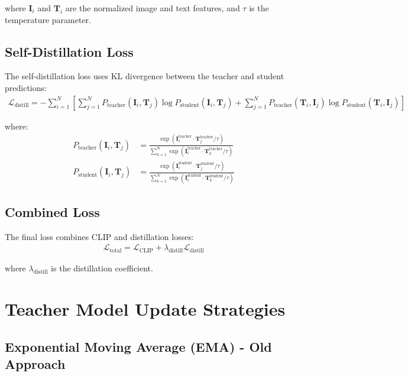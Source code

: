 \documentclass[11pt]{article}
\begin{document}
where $\mathbf{I}_i$ and $\mathbf{T}_i$ are the normalized image and text features, and $\tau$ is the temperature parameter.

\subsection{Self-Distillation Loss}

The self-distillation loss uses KL divergence between the teacher and student predictions:
\begin{align}
\mathcal{L}_{\text{distill}} = -\sum_{i=1}^{N} \left[ \sum_{j=1}^{N} P_{\text{teacher}}(\mathbf{I}_i, \mathbf{T}_j) \log P_{\text{student}}(\mathbf{I}_i, \mathbf{T}_j) + \sum_{j=1}^{N} P_{\text{teacher}}(\mathbf{T}_i, \mathbf{I}_j) \log P_{\text{student}}(\mathbf{T}_i, \mathbf{I}_j) \right]
\end{align}

where:
\begin{align}
P_{\text{teacher}}(\mathbf{I}_i, \mathbf{T}_j) &= \frac{\exp(\mathbf{I}_i^{\text{teacher}} \cdot \mathbf{T}_j^{\text{teacher}} / \tau)}{\sum_{k=1}^{N} \exp(\mathbf{I}_i^{\text{teacher}} \cdot \mathbf{T}_k^{\text{teacher}} / \tau)} \\
P_{\text{student}}(\mathbf{I}_i, \mathbf{T}_j) &= \frac{\exp(\mathbf{I}_i^{\text{student}} \cdot \mathbf{T}_j^{\text{student}} / \tau)}{\sum_{k=1}^{N} \exp(\mathbf{I}_i^{\text{student}} \cdot \mathbf{T}_k^{\text{student}} / \tau)}
\end{align}

\subsection{Combined Loss}

The final loss combines CLIP and distillation losses:
\begin{align}
\mathcal{L}_{\text{total}} = \mathcal{L}_{\text{CLIP}} + \lambda_{\text{distill}} \mathcal{L}_{\text{distill}}
\end{align}

where $\lambda_{\text{distill}}$ is the distillation coefficient.

\section{Teacher Model Update Strategies}

\subsection{Exponential Moving Average (EMA) - Old Approach}
\end{document}
